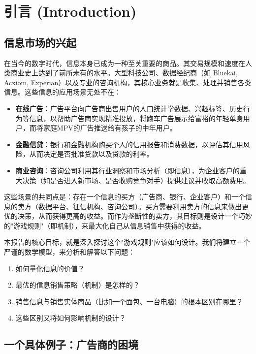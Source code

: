 \section{引言 (Introduction)}

\subsection{信息市场的兴起}

在当今的数字时代，信息本身已成为一种至关重要的商品。其交易规模和速度在人类商业史上达到了前所未有的水平。大型科技公司、数据经纪商（如 Bluekai, Acxiom, Experian）以及专业的咨询机构，其核心业务就是收集、处理并销售各类信息。这些信息的应用场景无处不在：

\begin{itemize}
   \item \textbf{在线广告}：广告平台向广告商出售用户的人口统计学数据、兴趣标签、历史行为等信息，以帮助广告商实现精准投放，将跑车广告展示给富裕的年轻单身用户，而将家庭MPV的广告推送给有孩子的中年用户。
   \item \textbf{金融信贷}：银行和金融机构购买个人的信用报告和消费数据，以评估其信用风险，从而决定是否批准贷款以及贷款的利率。
   \item \textbf{商业咨询}：咨询公司利用其行业洞察和市场分析（即信息），为企业客户的重大决策（如是否进入新市场、是否收购竞争对手）提供建议并收取高额费用。
\end{itemize}

这些场景的共同点是：存在一个信息的买方（广告商、银行、企业客户）和一个信息的卖方（数据平台、征信机构、咨询公司）。买方需要利用卖方的信息来做出更优的决策，从而获得更高的收益。而作为垄断性的卖方，其目标则是设计一个巧妙的"游戏规则"（即机制），来最大化自己从信息销售中获得的收益。

本报告的核心目标，就是深入探讨这个"游戏规则"应该如何设计。我们将建立一个严谨的数学模型，来分析和解答以下问题：

\begin{enumerate}
   \item 如何量化信息的价值？
   \item 最优的信息销售策略（机制）是怎样的？
   \item 销售信息与销售实体商品（比如一个面包、一台电脑）的根本区别在哪里？
   \item 这些区别又将如何影响机制的设计？
\end{enumerate}

\subsection{一个具体例子：广告商的困境}

